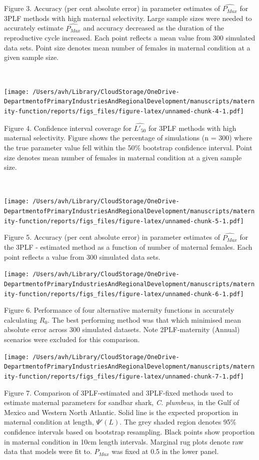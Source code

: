 \documentclass[
]{article}
\begin{document}
Figure 3. Accuracy (per cent absolute error) in parameter estimates of
\(\hat{P_{Max}}\) for 3PLF methods with high maternal selectivity. Large
sample sizes were needed to accurately estimate \(\hat{P_{Max}}\) and
accuracy decreased as the duration of the reproductive cycle increased.
Each point reflects a mean value from 300 simulated data sets. Point
size denotes mean number of females in maternal condition at a given
sample size.\\
\strut \\
\newpage

\texttt{[image: /Users/avh/Library/CloudStorage/OneDrive-DepartmentofPrimaryIndustriesAndRegionalDevelopment/manuscripts/maternity-function/reports/figs\_files/figure-latex/unnamed-chunk-4-1.pdf]}

Figure 4. Confidence interval coverage for \(\hat{L'_{50}}\) for 3PLF
methods with high maternal selectivity. Figure shows the percentage of
simulations (n = 300) where the true parameter value fell within the
50\% bootstrap confidence interval. Point size denotes mean number of
females in maternal condition at a given sample size.\\
\strut \\
\newpage

\texttt{[image: /Users/avh/Library/CloudStorage/OneDrive-DepartmentofPrimaryIndustriesAndRegionalDevelopment/manuscripts/maternity-function/reports/figs\_files/figure-latex/unnamed-chunk-5-1.pdf]}

Figure 5. Accuracy (per cent absolute error) in parameter estimates of
\(\hat{P_{Max}}\) for the 3PLF - estimated method as a function of
number of maternal females. Each point reflects a value from 300
simulated data sets.\\
\newpage

\texttt{[image: /Users/avh/Library/CloudStorage/OneDrive-DepartmentofPrimaryIndustriesAndRegionalDevelopment/manuscripts/maternity-function/reports/figs\_files/figure-latex/unnamed-chunk-6-1.pdf]}

Figure 6. Performance of four alternative maternity functions in
accurately calculating \(R_0\). The best performing method was that
which minimised mean absolute error across 300 simulated datasets. Note
2PLF-maternity (Annual) scenarios were excluded for this comparison.\\
\newpage

\texttt{[image: /Users/avh/Library/CloudStorage/OneDrive-DepartmentofPrimaryIndustriesAndRegionalDevelopment/manuscripts/maternity-function/reports/figs\_files/figure-latex/unnamed-chunk-7-1.pdf]}

Figure 7. Comparison of 3PLF-estimated and 3PLF-fixed methods used to
estimate maternal parameters for sandbar shark, \emph{C. plumbeus}, in
the Gulf of Mexico and Western North Atlantic. Solid line is the
expected proportion in maternal condition at length, \(\Psi'(L)\). The
grey shaded region denotes 95\% confidence intervals based on bootstrap
resampling. Black points show proportion in maternal condition in 10cm
length intervals. Marginal rug plots denote raw data that models were
fit to. \(P_{Max}\) was fixed at 0.5 in the lower panel.
\end{document}

